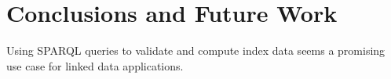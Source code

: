 \section{Conclusions and Future Work}

Using SPARQL queries to validate and compute index data seems a promising use
case for linked data applications.



